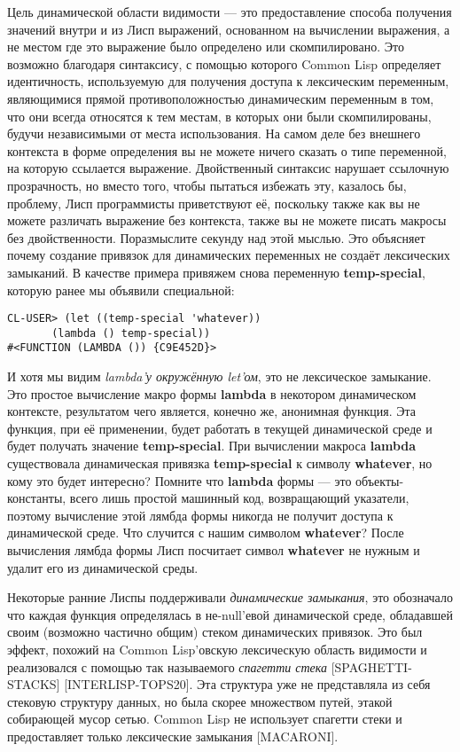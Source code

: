 Цель динамической области видимости --- это предоставление способа получения значений внутри и из Лисп выражений, основанном на вычислении выражения, а не местом где это выражение было определено или скомпилировано. Это возможно благодаря синтаксису, с помощью которого Common Lisp определяет идентичность, используемую для получения доступа к лексическим переменным, являющимися прямой противоположностью динамическим переменным в том, что они всегда относятся к тем местам, в которых они были скомпилированы, будучи независимыми от места использования. На самом деле без внешнего контекста в форме определения вы не можете ничего сказать о типе переменной, на которую ссылается выражение. Двойственный синтаксис нарушает ссылочную прозрачность, но вместо того, чтобы пытаться избежать эту, казалось бы, проблему, Лисп программисты приветствуют её, поскольку также как вы не можете различать выражение без контекста, также вы не можете писать макросы без двойственности. Поразмыслите секунду над этой мыслью. Это объясняет почему создание привязок для динамических переменных не создаёт лексических замыканий. В качестве примера привяжем снова переменную \textbf{temp-special}, которую ранее мы объявили специальной:

\begin{verbatim}
CL-USER> (let ((temp-special 'whatever))
	   (lambda () temp-special))
#<FUNCTION (LAMBDA ()) {C9E452D}>
\end{verbatim}

И хотя мы видим \emph{lambda'у окружённую let'ом}, это не лексическое замыкание. Это простое вычисление макро формы \textbf{lambda} в некотором динамическом контексте, результатом чего является, конечно же, анонимная функция. Эта функция, при её применении, будет работать в текущей динамической среде и будет получать значение \textbf{temp-special}. При вычислении макроса \textbf{lambda} существовала динамическая привязка \textbf{temp-special} к символу \textbf{whatever}, но кому это будет интересно? Помните что \textbf{lambda} формы --- это объекты-константы, всего лишь простой машинный код, возвращающий указатели, поэтому вычисление этой лямбда формы никогда не получит доступа к динамической среде. Что случится с нашим символом \textbf{whatever}? После вычисления лямбда формы Лисп посчитает символ \textbf{whatever} не нужным и удалит его из динамической среды.

Некоторые ранние Лиспы поддерживали \emph{динамические замыкания}, это обозначало что каждая функция определялась в не-null'евой динамической среде, обладавшей своим (возможно частично общим) стеком динамических привязок. Это был эффект, похожий на Common Lisp'овскую лексическую область видимости и реализовался с помощью так называемого \emph{спагетти стека} [SPAGHETTI-STACKS] [INTERLISP-TOPS20]. Эта структура уже не представляла из себя стековую структуру данных, но была скорее множеством путей, этакой собирающей мусор сетью. Common Lisp не использует спагетти стеки и предоставляет только лексические замыкания [MACARONI].

